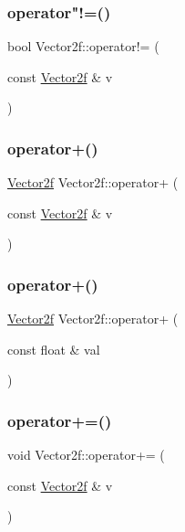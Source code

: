 \subsubsection{\texorpdfstring{operator"!=()}{operator!=()}}
{\footnotesize\ttfamily bool Vector2f\+::operator!= (\begin{DoxyParamCaption}\item[{const \mbox{\hyperlink{class_vector2f}{Vector2f}} \&}]{v }\end{DoxyParamCaption})}

\mbox{\label{class_vector2f_a10ece16e53d788378932abb6f6212c68}} 
\subsubsection{\texorpdfstring{operator+()}{operator+()}\hspace{0.1cm}{\footnotesize\ttfamily [1/2]}}
{\footnotesize\ttfamily \mbox{\hyperlink{class_vector2f}{Vector2f}} Vector2f\+::operator+ (\begin{DoxyParamCaption}\item[{const \mbox{\hyperlink{class_vector2f}{Vector2f}} \&}]{v }\end{DoxyParamCaption})}

\mbox{\label{class_vector2f_ad9eef1fcb6d70b16b264a3aac5ae2081}} 
\subsubsection{\texorpdfstring{operator+()}{operator+()}\hspace{0.1cm}{\footnotesize\ttfamily [2/2]}}
{\footnotesize\ttfamily \mbox{\hyperlink{class_vector2f}{Vector2f}} Vector2f\+::operator+ (\begin{DoxyParamCaption}\item[{const float \&}]{val }\end{DoxyParamCaption})}

\mbox{\label{class_vector2f_a11ff6a64f8db4da7ae303cc9261e2386}} 
\subsubsection{\texorpdfstring{operator+=()}{operator+=()}}
{\footnotesize\ttfamily void Vector2f\+::operator+= (\begin{DoxyParamCaption}\item[{const \mbox{\hyperlink{class_vector2f}{Vector2f}} \&}]{v }\end{DoxyParamCaption})}


